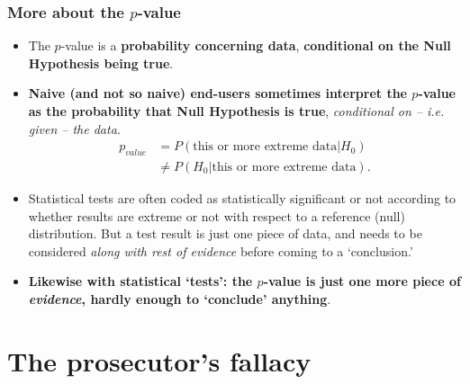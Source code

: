 \documentclass[10pt,handout]{beamer}\usepackage[]{graphicx}\usepackage[]{color}
\begin{document}
\begin{frame}
	\frametitle{More about the $p$-value}
	
	\begin{itemize}
		\setlength\itemsep{.3em}
		\item The $p$-value is a \textbf{probability concerning data}, \textbf{conditional on the Null Hypothesis being true}. \pause
		\item \textbf{Naive (and not so naive) end-users sometimes interpret the $p$-value  as
			the probability that Null Hypothesis is true}, \textit{conditional on -- i.e. given --  the data.} \pause
		\begin{align*}
		p_{value} & = P(\textrm{this or more extreme data}| H_0) \\
		& \neq P(H_0|\textrm{this or more extreme data}).
		\end{align*}
		\item Statistical tests are often coded as statistically significant or not according to whether results are extreme or not with respect to a reference (null)  distribution.  But a test result  is just one piece of data, and needs to be considered \textit{along with  rest of evidence} before coming to a `conclusion.' \item \textbf{Likewise with statistical `tests': the $p$-value is just one more piece of \textit{evidence}, hardly enough to `conclude' anything}. 
	\end{itemize}
\end{frame}

\section{The prosecutor's fallacy}
\end{document}
